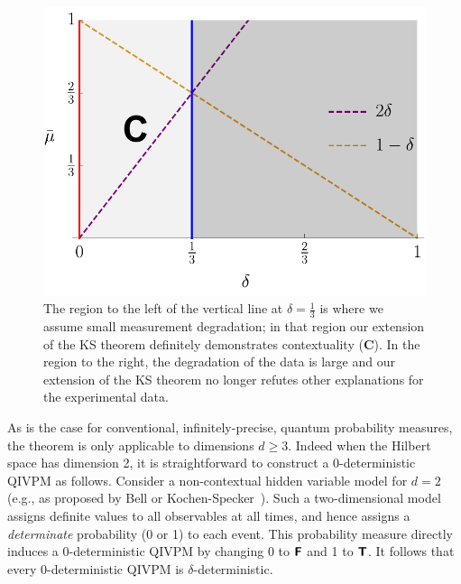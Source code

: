 \documentclass[english,reprint, aps, prl,superscriptaddress, showpacs,
showkeys, longbibliography, amsmath, amssymb, floatfix]{revtex4-1}
\theoremstyle{plain}
\theoremstyle{definition}
\newcommand{\interval}[1]{{\normalfont\textsf{\textbf{#1}}}}
\newcommand{\imposs}{\interval{F}}
\newcommand{\necess}{\interval{T}}
\begin{document}
\begin{figure}
\begin{center}
\includegraphics[scale=0.5]{prop_letter_ajhs_referee_response_nb} 
\par\end{center}
\caption{The region to the left of the vertical line at
$\delta=\frac{1}{3}$ is where we assume small measurement degradation;
in that region our extension of the KS theorem definitely demonstrates
contextuality ({\bf{\sf C}}). In the region to the right, the degradation of the data
is large and our extension of the KS theorem no longer refutes other
explanations for the experimental data.}
\label{fignoname}
\end{figure}

As is the case for conventional, infinitely-precise, quantum
probability measures, the theorem is only applicable to dimensions
$d \geq 3$. Indeed when the Hilbert space has dimension 2, it is
straightforward to construct a 0-deterministic QIVPM as
follows. Consider a non-contextual hidden variable model for $d=2$
(e.g., as proposed by Bell or
Kochen-Specker~\cite{BELL_1966,kochenspecker1967}). Such a
two-dimensional model assigns definite values to all observables at
all times, and hence assigns a \emph{determinate} probability (0 or 1)
to each event. This probability measure directly induces a
0-deterministic QIVPM by changing 0 to $\imposs$ and 1 to
$\necess$.  It follows that every 0-deterministic QIVPM is
$\delta$-deterministic.
\end{document}
